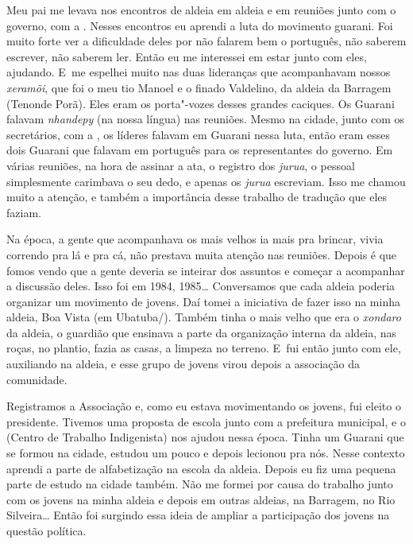 Meu pai me levava nos encontros de aldeia em aldeia e em reuniões junto
com o governo, com a . Nesses encontros eu aprendi a luta do
movimento guarani. Foi muito forte ver a dificuldade deles por não falarem bem o português,
não saberem escrever, não saberem ler. Então eu me interessei em estar
junto com eles, ajudando. E~me espelhei muito nas duas lideranças que
acompanhavam nossos \emph{xeramõi}, que foi o meu tio Manoel e o finado
Valdelino, da aldeia da Barragem (Tenonde Porã). Eles eram os
porta"-vozes desses grandes caciques. Os Guarani falavam \emph{nhandepy} (na
nossa língua) nas reuniões. Mesmo na cidade, junto com os secretários,
com a , os líderes falavam em Guarani nessa luta, então eram esses
dois Guarani que falavam em português para os representantes do
governo. Em várias reuniões, na hora de assinar a ata, o registro dos
\emph{jurua}, o pessoal simplesmente carimbava o seu dedo, e apenas os \emph{jurua}
escreviam. Isso me chamou muito a atenção, e também a importância desse
trabalho de tradução que eles faziam.

Na época, a gente que acompanhava os mais velhos ia mais pra brincar,
vivia correndo pra lá e pra cá, não prestava muita atenção nas
reuniões. Depois é que fomos vendo que a gente deveria se inteirar dos
assuntos e começar a acompanhar a discussão deles. Isso foi em 1984,
1985\ldots{} Conversamos que cada aldeia poderia organizar um movimento de
jovens. Daí tomei a iniciativa de fazer isso na minha aldeia, Boa Vista
(em Ubatuba/). Também tinha o mais velho que era o \emph{xondaro} da aldeia,
o guardião que ensinava a parte da organização interna da aldeia, nas
roças, no plantio, fazia as casas, a limpeza no terreno. E~fui então
junto com ele, auxiliando na aldeia, e esse grupo de jovens virou
depois a associação da comunidade.

Registramos a Associação e, como eu estava movimentando os jovens, fui
eleito o presidente. Tivemos uma proposta de escola junto com a
prefeitura municipal, e o  (Centro de Trabalho Indigenista) nos
ajudou nessa época. Tinha um Guarani que se formou na cidade, estudou
um pouco e depois lecionou pra nós. Nesse contexto aprendi a parte de
alfabetização na escola da aldeia. Depois eu fiz uma pequena parte de
estudo na cidade também. Não me formei por causa do trabalho junto com
os jovens na minha aldeia e depois em outras aldeias, na Barragem, no
Rio Silveira\ldots{} Então foi surgindo essa ideia de ampliar a participação
dos jovens na questão política.

